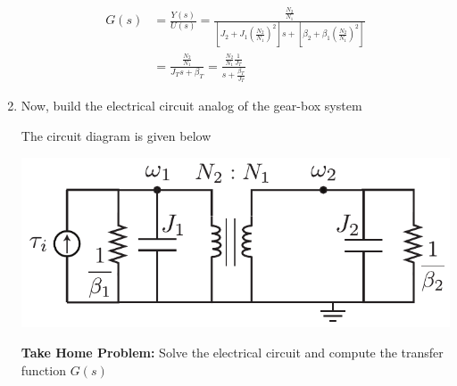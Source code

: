 \documentclass[twoside]{article}
\begin{document}
\begin{enumerate}
\begin{align*}
	G(s) &= \frac{Y(s)}{U(s)} = 
	\frac{ \frac{N_2}{N_1}  }{ \left[ J_2 + J_1  \left(\frac{N_2}{N_1}\right)^2  \right] s +  \left[ \beta_2 + \beta_1 \left(\frac{N_2}{N_1}\right)^2 \right]}
	\\
	&= 
	\frac{ \frac{N_2}{N_1}  }{ J_T s + \beta_T } = \frac{ \frac{N_2}{N_1} \frac{1}{J_T}  }{ s + \frac{\beta_T}{J_T} } 
\end{align*}
  
  \item Now, build the electrical circuit analog of the gear-box system
  
  \par
  
  The circuit diagram is given below
  
    \begin{minipage}[h]{0.75\linewidth}
    \begin{center}
      \includegraphics[width=1\textwidth]{ex2_elec}
    \end{center}
  \end{minipage}

\textbf{Take Home Problem:} Solve the electrical circuit and compute the transfer function $G(s)$   
  
\end{enumerate}


\end{document}

